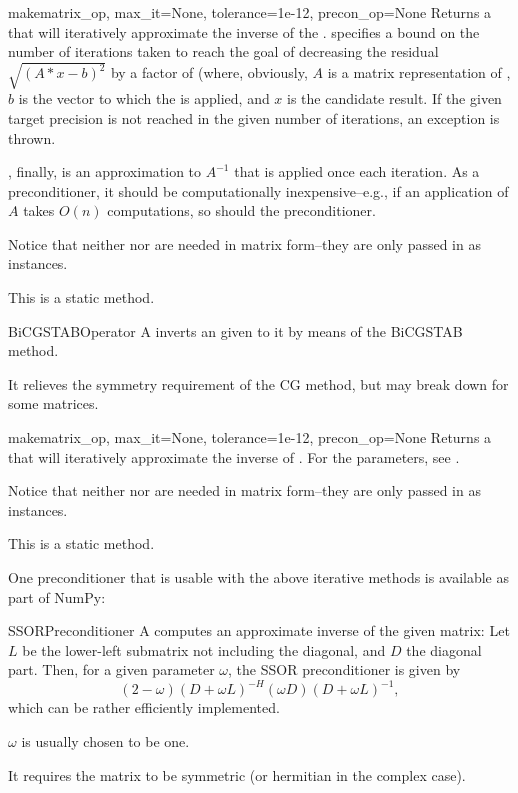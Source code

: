 \begin{methoddesc}{make}{matrix\_op, max\_it=None, tolerance=1e-12, precon\_op=None}
  Returns a  that will iteratively approximate the
  inverse of the  . 
  specifies a bound on the number of iterations taken to reach the
  goal of decreasing the residual $\sqrt{(A*x-b)^2}$ by a factor of
   (where, obviously, $A$ is a matrix representation of
  , $b$ is the vector to which the 
  is applied, and $x$ is the candidate result.  If the given target
  precision is not reached in the given number of iterations, an
  exception is thrown.

  , finally, is an approximation to $A^{-1}$ that is
  applied once each iteration. As a preconditioner, it should be
  computationally inexpensive--e.g., if an application of $A$ takes $O(n)$
  computations, so should the preconditioner.

  Notice that neither  nor  are needed
  in matrix form--they are only passed in as  instances.

  This is a static method.
\end{methoddesc}
\begin{classdesc*}{BiCGSTABOperator}
  A  inverts an  given to it
  by means of the BiCGSTAB method.

  It relieves the symmetry requirement of the CG method, but may break
  down for some matrices.
\end{classdesc*}
\begin{methoddesc}{make}{matrix\_op, max\_it=None, tolerance=1e-12, precon\_op=None}
  Returns a  that will iteratively approximate the
  inverse of . For the parameters, see .

  Notice that neither  nor  are needed
  in matrix form--they are only passed in as  instances.

  This is a static method.
\end{methoddesc}
One preconditioner that is usable with the above iterative methods is
available as part of NumPy:
\begin{classdesc*}{SSORPreconditioner}
  A  computes an approximate inverse of the
  given matrix: Let $L$ be the lower-left submatrix not including the
  diagonal, and $D$ the diagonal part. Then, for a given parameter
  $\omega$, the SSOR preconditioner is given by 
  \[
  (2-\omega)(D+\omega L)^{-H}(\omega D)(D+\omega L)^{-1},
  \]
  which can be rather efficiently implemented.

  $\omega$ is usually chosen to be one.

  It requires the matrix to be symmetric (or hermitian in the complex
  case).
\end{classdesc*}
